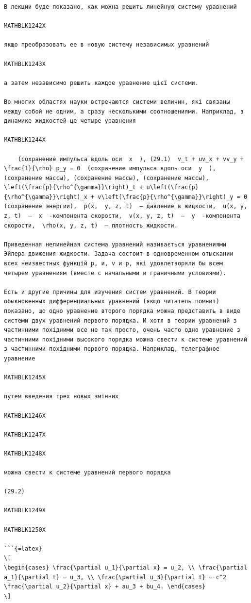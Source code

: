 \documentclass[
  ukrainian,
]{article}
\begin{document}
\begin{verbatim}
В лекции буде показано, как можна решить линейную систему уравнений

MATHBLK1242X

якщо преобразовать ее в новую систему независимых уравнений

MATHBLK1243X

а затем независимо решить каждое уравнение цієї системи.

Во многих областях науки встречаются системи величин, які связаны между собой не одним, а сразу несколькими соотношениями. Наприклад, в динамике жидкостей—це четыре уравнения

MATHBLK1244X

    (сохранение импульса вдоль оси  x  ), (29.1)  v_t + uv_x + vv_y + \frac{1}{\rho} p_y = 0  (сохранение импульса вдоль оси  y  ), (сохранение массы), (сохранение массы), (сохранение массы),  \left(\frac{p}{\rho^{\gamma}}\right)_t + u\left(\frac{p}{\rho^{\gamma}}\right)_x + v\left(\frac{p}{\rho^{\gamma}}\right)_y = 0  (сохранение энергии),  p(x,  y, z, t)  — давление в жидкости,  u(x, y, z, t)  —  x  -компонента скорости,  v(x, y, z, t)  —  y  -компонента скорости,  \rho(x, y, z, t)  — плотность жидкости.

Приведенная нелинейная система уравнений називається уравнениями Эйлера движения жидкости. Задача состоит в одновременном отыскании всех неизвестных функцій р, и, v и р, які удовлетворяли бы всем четырем уравнениям (вместе с начальными и граничными условиями).

Есть и другие причины для изучения систем уравнений. В теории обыкновенных дифференциальных уравнений (якщо читатель помнит) показано, що одно уравнение второго порядка можна представить в виде системи двух уравнений первого порядка. И хотя в теории уравнений з частинними похідними все не так просто, очень часто одно уравнение з частинними похідними высокого порядка можна свести к системе уравнений з частинними похідними первого порядка. Наприклад, телеграфное уравнение

MATHBLK1245X

путем введения трех новых змінних

MATHBLK1246X

MATHBLK1247X

MATHBLK1248X

можна свести к системе уравнений первого порядка

(29.2)

MATHBLK1249X

MATHBLK1250X

```{=latex}
\[
\begin{cases} \frac{\partial u_1}{\partial x} = u_2, \\ \frac{\partial a_1}{\partial t} = u_3, \\ \frac{\partial u_3}{\partial t} = c^2 \frac{\partial u_2}{\partial x} + au_3 + bu_4. \end{cases}
\]
\end{verbatim}
\end{document}

